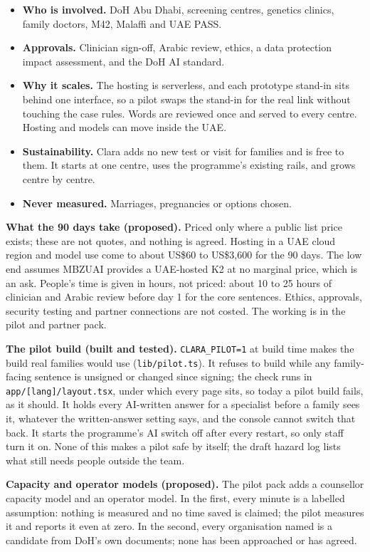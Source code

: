 \documentclass[10.5pt,a4paper]{article}
\newcommand{\code}[1]{\texttt{\small #1}}
\newcommand{\file}[1]{\leavevmode\textcolor{muted}{\texttt{\small #1}}}
\begin{document}
\begin{itemize}
  \item \textbf{Who is involved.} DoH Abu Dhabi, screening centres, genetics clinics, family doctors, M42, Malaffi and
        UAE PASS.
  \item \textbf{Approvals.} Clinician sign-off, Arabic review, ethics, a data protection impact assessment, and the DoH AI
        standard.
  \item \textbf{Why it scales.} The hosting is serverless, and each prototype stand-in sits behind one interface, so a pilot
        swaps the stand-in for the real link without touching the case rules. Words are reviewed once and served to every
        centre. Hosting and models can move inside the UAE.
  \item \textbf{Sustainability.} Clara adds no new test or visit for families and is free to them. It starts at one
        centre, uses the programme's existing rails, and grows centre by centre.
  \item \textbf{Never measured.} Marriages, pregnancies or options chosen.
\end{itemize}

\textbf{What the 90 days take (proposed).} Priced only where a public list price exists; these are not quotes, and
nothing is agreed. Hosting in a UAE cloud region and model use come to about US\$60 to US\$3,600 for the 90 days. The low
end assumes MBZUAI provides a UAE-hosted K2 at no marginal price, which is an ask. People's time is given in hours, not
priced: about 10 to 25 hours of clinician and Arabic review before day 1 for the core sentences. Ethics, approvals,
security testing and partner connections are not costed. The working is in the pilot and partner pack.

\textbf{The pilot build (built and tested).} \code{CLARA\_PILOT=1} at build time makes the build real families would
use (\file{lib/pilot.ts}). It refuses to build while any family-facing sentence is unsigned or changed since signing;
the check runs in \file{app/[lang]/layout.tsx}, under which every page sits, so today a pilot build fails, as it
should. It holds every AI-written answer for a specialist before a family sees it, whatever the written-answer setting
says, and the console cannot switch that back. It starts the programme's AI switch off after every restart, so only
staff turn it on. None of this makes a pilot safe by itself; the draft hazard log lists what still needs people
outside the team.

\textbf{Capacity and operator models (proposed).} The pilot pack adds a counsellor capacity model and an operator
model. In the first, every minute is a labelled assumption: nothing is measured and no time saved is claimed; the pilot
measures it and reports it even at zero. In the second, every organisation named is a candidate from DoH's own
documents; none has been approached or has agreed.
\end{document}
